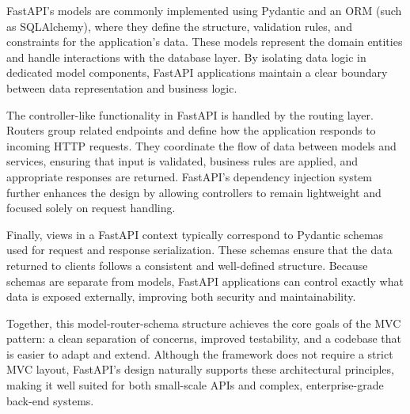 FastAPI's models are commonly implemented using Pydantic and an ORM (such as SQLAlchemy), where they define the structure, validation rules, and constraints for the application's data. These models represent the domain entities and handle interactions with the database layer. By isolating data logic in dedicated model components, FastAPI applications maintain a clear boundary between data representation and business logic.

The controller-like functionality in FastAPI is handled by the routing layer. Routers group related endpoints and define how the application responds to incoming HTTP requests. They coordinate the flow of data between models and services, ensuring that input is validated, business rules are applied, and appropriate responses are returned. FastAPI's dependency injection system further enhances the design by allowing controllers to remain lightweight and focused solely on request handling.

Finally, views in a FastAPI context typically correspond to Pydantic schemas used for request and response serialization. These schemas ensure that the data returned to clients follows a consistent and well-defined structure. Because schemas are separate from models, FastAPI applications can control exactly what data is exposed externally, improving both security and maintainability.

Together, this model-router-schema structure achieves the core goals of the MVC pattern: a clean separation of concerns, improved testability, and a codebase that is easier to adapt and extend. Although the framework does not require a strict MVC layout, FastAPI's design naturally supports these architectural principles, making it well suited for both small-scale APIs and complex, enterprise-grade back-end systems.

